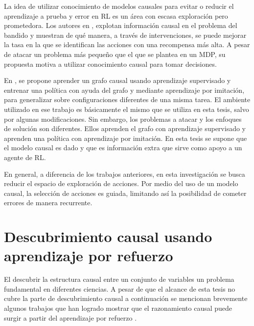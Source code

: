 
La idea de utilizar conocimiento de modelos
causales para evitar o reducir el aprendizaje a 
prueba y error en RL es un área con escasa 
exploración pero prometedora.
Los autores en \cite{lattimore2016causal},
explotan información causal en el problema
del bandido y muestran de qué manera, a través
de intervenciones, se puede mejorar la
tasa en la que se identifican las acciones
con una recompensa más alta. A pesar de atacar un problema más pequeño
que el que se plantea en un MDP, su propuesta motiva a utilizar 
conocimiento causal para tomar decisiones.


En \cite{nair2019causal}, se propone
aprender un grafo causal usando aprendizaje supervisado y
entrenar una política con ayuda del grafo y mediante aprendizaje por imitación, para generalizar sobre 
configuraciones diferentes de una misma
tarea.
El ambiente utilizado en ese trabajo es básicamente el mismo que se utiliza en esta
tesis, salvo por algunas modificaciones. Sin embargo, los problemas a atacar y los enfoques
de solución son diferentes. Ellos aprenden el grafo con aprendizaje supervisado y
aprenden una política con aprendizaje por imitación. En esta tesis se supone que
el modelo causal es dado y que es información extra que sirve como apoyo a un agente de RL.

En general, a diferencia de los trabajos anteriores,
en esta investigación se busca reducir el espacio de exploración
de acciones. 
Por medio del uso de un modelo causal, la selección de acciones es guiada, limitando así la posibilidad de cometer errores de manera recurrente.

\section{Descubrimiento causal usando aprendizaje por refuerzo}

El descubrir la estructura causal entre un conjunto de variables un problema
fundamental en diferentes ciencias. A pesar de que 
el alcance de esta tesis no cubre la parte de descubrimiento causal 
a continuación se mencionan brevemente algunos trabajos 
que han logrado mostrar que el razonamiento causal puede surgir a partir del aprendizaje por refuerzo \cite{dasgupta2019causal, madumal2019explainable, zhu2019causal}. 


